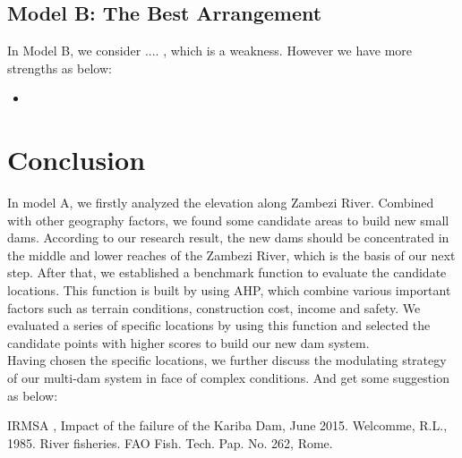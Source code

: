 \documentclass{mcmthesis}
\begin{document}
\subsection{Model B: The Best Arrangement}
In Model B, we consider .... , which is a weakness. However we have more strengths as below:
\begin{itemize}
  \item 
\end{itemize}

\section{Conclusion}
\indent \indent In model A, we firstly analyzed the elevation along Zambezi River. Combined with other geography factors, we found some candidate areas to build new small dams. According to our research result, the new dams should be concentrated in the middle and lower reaches of the Zambezi River, which is the basis of our next step. After that, we established a benchmark function to evaluate the candidate locations. This function is built by using AHP, which combine various important factors such as terrain conditions, construction cost, income and safety. We evaluated a series of specific locations by using this function and selected the candidate points with higher scores to build our new dam system.\\
\indent Having chosen the specific locations, we further discuss the modulating strategy of our multi-dam system in face of complex conditions. And get some suggestion as below:

\begin{thebibliography}{99}
 IRMSA , Impact of the failure of the Kariba Dam, June 2015.
 Welcomme, R.L., 1985. River fisheries. FAO Fish. Tech. Pap. No. 262, Rome.
\end{thebibliography}

\clearpage
\end{document}

